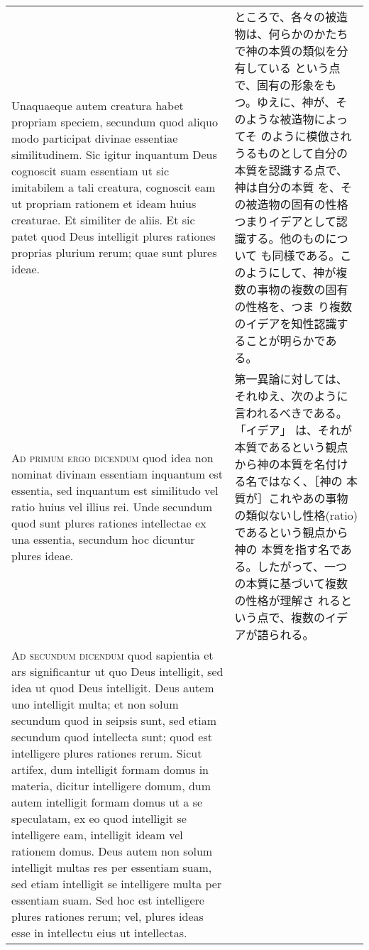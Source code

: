 \documentclass[10pt]{jsarticle} %
\begin{document}
\begin{longtable}{p{21em}p{21em}}
Unaquaeque autem creatura habet propriam speciem, secundum quod aliquo
modo participat divinae essentiae similitudinem. Sic igitur inquantum
Deus cognoscit suam essentiam ut sic imitabilem a tali creatura,
cognoscit eam ut propriam rationem et ideam huius creaturae. Et
similiter de aliis. Et sic patet quod Deus intelligit plures rationes
proprias plurium rerum; quae sunt plures ideae.

&

ところで、各々の被造物は、何らかのかたちで神の本質の類似を分有している
という点で、固有の形象をもつ。ゆえに、神が、そのような被造物によってそ
のように模倣されうるものとして自分の本質を認識する点で、神は自分の本質
を、その被造物の固有の性格つまりイデアとして認識する。他のものについて
も同様である。このようにして、神が複数の事物の複数の固有の性格を、つま
り複数のイデアを知性認識することが明らかである。

\\

{\scshape Ad primum ergo dicendum} quod idea non nominat divinam
essentiam inquantum est essentia, sed inquantum est similitudo vel
ratio huius vel illius rei. Unde secundum quod sunt plures rationes
intellectae ex una essentia, secundum hoc dicuntur plures ideae.

&

第一異論に対しては、それゆえ、次のように言われるべきである。「イデア」
は、それが本質であるという観点から神の本質を名付ける名ではなく、［神の
本質が］これやあの事物の類似ないし性格(ratio)であるという観点から神の
本質を指す名である。したがって、一つの本質に基づいて複数の性格が理解さ
れるという点で、複数のイデアが語られる。

\\


{\scshape Ad secundum dicendum} quod sapientia et ars significantur ut
quo Deus intelligit, sed idea ut quod Deus intelligit. Deus autem uno
intelligit multa; et non solum secundum quod in seipsis sunt, sed
etiam secundum quod intellecta sunt; quod est intelligere plures
rationes rerum. Sicut artifex, dum intelligit formam domus in materia,
dicitur intelligere domum, dum autem intelligit formam domus ut a se
speculatam, ex eo quod intelligit se intelligere eam, intelligit ideam
vel rationem domus. Deus autem non solum intelligit multas res per
essentiam suam, sed etiam intelligit se intelligere multa per
essentiam suam. Sed hoc est intelligere plures rationes rerum; vel,
plures ideas esse in intellectu eius ut intellectas.

&


\end{longtable}
\end{document}
